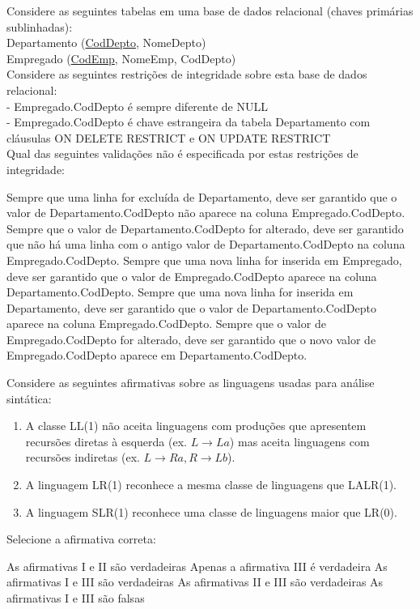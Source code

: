 \documentclass[12pt, addpoints]{exam}
\begin{document}
\begin{questions}
\question
Considere as seguintes tabelas em uma base de dados relacional (chaves primárias sublinhadas):\\
Departamento (\underline{CodDepto}, NomeDepto)\\
Empregado (\underline{CodEmp}, NomeEmp, CodDepto)\\
Considere as seguintes restrições de integridade sobre esta base de dados relacional:\\
- Empregado.CodDepto é sempre diferente de NULL\\
- Empregado.CodDepto é chave estrangeira da tabela Departamento com cláusulas ON DELETE RESTRICT e ON UPDATE RESTRICT\\
Qual das seguintes validações não é especificada por estas restrições de integridade:
\begin{choices}
\choice Sempre que uma linha for excluída de Departamento, deve ser garantido que o valor de Departamento.CodDepto não aparece na coluna Empregado.CodDepto.
\choice Sempre que o valor de Departamento.CodDepto for alterado, deve ser garantido que não há uma linha com o antigo valor de Departamento.CodDepto na coluna Empregado.CodDepto.
\choice Sempre que uma nova linha for inserida em Empregado, deve ser garantido que o valor de Empregado.CodDepto aparece na coluna Departamento.CodDepto.
\choice Sempre que uma nova linha for inserida em Departamento, deve ser garantido que o valor de Departamento.CodDepto aparece na coluna Empregado.CodDepto.
\choice Sempre que o valor de Empregado.CodDepto for alterado, deve ser garantido que o novo valor de Empregado.CodDepto aparece em Departamento.CodDepto.
\end{choices}

\question
Considere as seguintes afirmativas sobre as linguagens usadas para análise sintática:
\begin{enumerate}[label=\Roman*.]
    \item A classe LL(1) não aceita linguagens com produções que apresentem recursões diretas à esquerda (ex. \(L \rightarrow La\)) mas aceita linguagens com recursões indiretas (ex. \(L \rightarrow Ra, R \rightarrow Lb\)).
    \item A linguagem LR(1) reconhece a mesma classe de linguagens que LALR(1).
    \item A linguagem SLR(1) reconhece uma classe de linguagens maior que LR(0).
\end{enumerate}
Selecione a afirmativa correta:
\begin{choices}
\choice As afirmativas I e II são verdadeiras
\choice Apenas a afirmativa III é verdadeira
\choice As afirmativas I e III são verdadeiras
\choice As afirmativas II e III são verdadeiras
\choice As afirmativas I e III são falsas
\end{choices}



    \end{questions}
    
\end{document}
